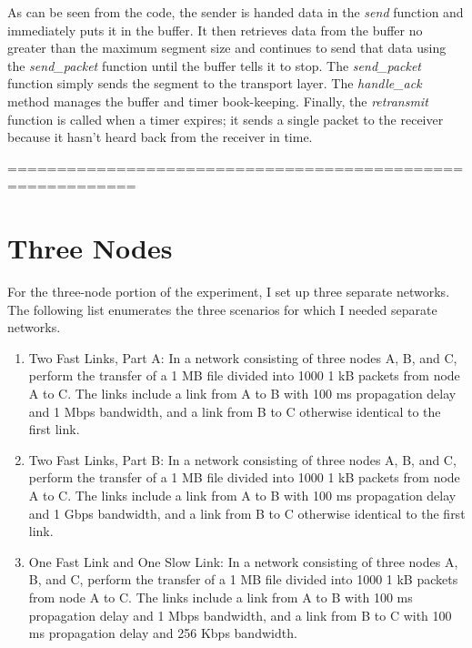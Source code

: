 \documentclass[11pt]{article}
\begin{document}
As can be seen from the code, the sender is handed data in the \emph{send} function and immediately puts it in the buffer. It then retrieves data from the buffer no greater than the maximum segment size and continues to send that data using the \emph{send_packet} function until the buffer tells it to stop. The \emph{send_packet} function simply sends the segment to the transport layer. The \emph{handle_ack} method manages the buffer and timer book-keeping. Finally, the \emph{retransmit} function is called when a timer expires; it sends a single packet to the receiver because it hasn't heard back from the receiver in time.

===========================================================

\section{Three Nodes}

For the three-node portion of the experiment, I set up three separate networks. The following list enumerates the three scenarios for which I needed separate networks. 

\begin{enumerate}

\item Two Fast Links, Part A: In a network consisting of three nodes A, B, and C, perform the transfer of a 1 MB file divided into 1000 1 kB packets from node A to C. The links include a link from A to B with 100 ms propagation delay and 1 Mbps bandwidth, and a link from B to C otherwise identical to the first link.

\item Two Fast Links, Part B: In a network consisting of three nodes A, B, and C, perform the transfer of a 1 MB file divided into 1000 1 kB packets from node A to C. The links include a link from A to B with 100 ms propagation delay and 1 Gbps bandwidth, and a link from B to C otherwise identical to the first link.

\item One Fast Link and One Slow Link: In a network consisting of three nodes A, B, and C, perform the transfer of a 1 MB file divided into 1000 1 kB packets from node A to C. The links include a link from A to B with 100 ms propagation delay and 1 Mbps bandwidth, and a link from B to C with 100 ms propagation delay and 256 Kbps bandwidth.

\end{enumerate}
\end{document}

